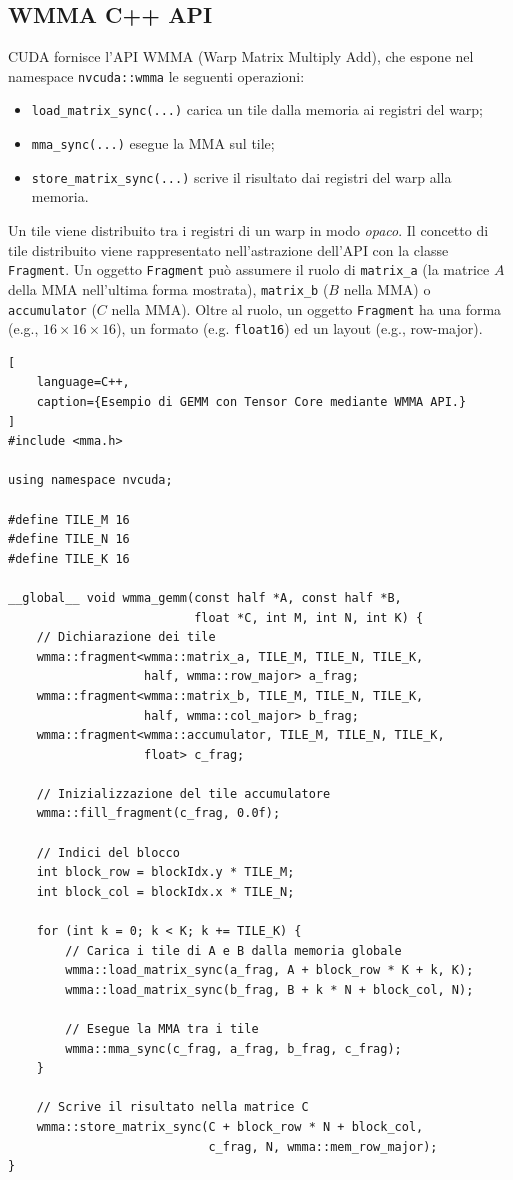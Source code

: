 \subsection{WMMA C++ API}
CUDA fornisce l'API WMMA (Warp Matrix Multiply Add), che espone nel namespace \texttt{nvcuda::wmma} le seguenti operazioni:
\begin{itemize}
    \item \texttt{load\_matrix\_sync(...)} carica un tile dalla memoria ai registri del warp;
    \item \texttt{mma\_sync(...)} esegue la MMA sul tile;
    \item \texttt{store\_matrix\_sync(...)} scrive il risultato dai registri del warp alla memoria.
\end{itemize}

Un tile viene distribuito tra i registri di un warp in modo \emph{opaco}. Il concetto di tile distribuito viene rappresentato nell'astrazione dell'API con la classe \texttt{Fragment}. Un oggetto \texttt{Fragment} può assumere il ruolo di \texttt{matrix\_a} (la matrice \(A\) della MMA nell'ultima forma mostrata), \texttt{matrix\_b} (\(B\) nella MMA) o \texttt{accumulator} (\(C\) nella MMA).
Oltre al ruolo, un oggetto \texttt{Fragment} ha una forma (e.g., \(16\times 16\times 16\)), un formato (e.g. \texttt{float16}) ed un layout (e.g., row-major).

\begin{lstlisting}[
    language=C++,
    caption={Esempio di GEMM con Tensor Core mediante WMMA API.}
]
#include <mma.h>

using namespace nvcuda;

#define TILE_M 16
#define TILE_N 16
#define TILE_K 16

__global__ void wmma_gemm(const half *A, const half *B, 
                          float *C, int M, int N, int K) {
    // Dichiarazione dei tile
    wmma::fragment<wmma::matrix_a, TILE_M, TILE_N, TILE_K, 
                   half, wmma::row_major> a_frag;
    wmma::fragment<wmma::matrix_b, TILE_M, TILE_N, TILE_K, 
                   half, wmma::col_major> b_frag;
    wmma::fragment<wmma::accumulator, TILE_M, TILE_N, TILE_K, 
                   float> c_frag;

    // Inizializzazione del tile accumulatore
    wmma::fill_fragment(c_frag, 0.0f);

    // Indici del blocco
    int block_row = blockIdx.y * TILE_M;
    int block_col = blockIdx.x * TILE_N;

    for (int k = 0; k < K; k += TILE_K) {
        // Carica i tile di A e B dalla memoria globale
        wmma::load_matrix_sync(a_frag, A + block_row * K + k, K);
        wmma::load_matrix_sync(b_frag, B + k * N + block_col, N);

        // Esegue la MMA tra i tile
        wmma::mma_sync(c_frag, a_frag, b_frag, c_frag);
    }

    // Scrive il risultato nella matrice C
    wmma::store_matrix_sync(C + block_row * N + block_col, 
                            c_frag, N, wmma::mem_row_major);
}
\end{lstlisting}

